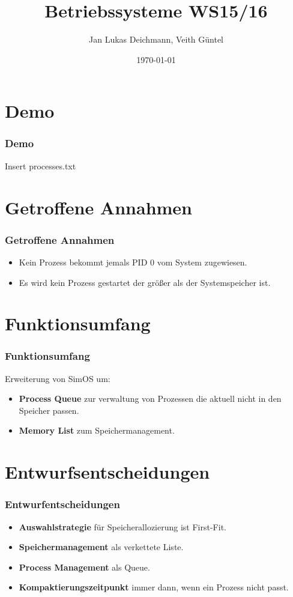 \documentclass{beamer}
\author{Jan Lukas Deichmann, Veith Güntel}
\title{Betriebssysteme WS15/16}
\date{\today}
\begin{document}
\maketitle
\frame{\tableofcontents}

\section{Demo}
\begin{frame}
\frametitle{Demo}
Insert processes.txt
\end{frame}

\section{Getroffene Annahmen}
\begin{frame}
\frametitle{Getroffene Annahmen}
\begin{itemize}
	\item Kein Prozess bekommt jemals PID 0 vom System zugewiesen.
	\item Es wird kein Prozess gestartet der größer als der Systemspeicher ist.
\end{itemize}
\end{frame}

\section{Funktionsumfang}
\begin{frame}
\frametitle{Funktionsumfang}
Erweiterung von SimOS um:
\begin{itemize}
	\item \textbf{Process Queue} zur verwaltung von Prozessen die aktuell nicht in den Speicher passen.
	\item \textbf{Memory List} zum Speichermanagement.
\end{itemize}
\end{frame}

\section{Entwurfsentscheidungen}
\begin{frame}
\frametitle{Entwurfentscheidungen}
\begin{itemize}
	\item \textbf{Auswahlstrategie} für Speicherallozierung ist First-Fit.
	\item \textbf{Speichermanagement} als verkettete Liste.
	\item \textbf{Process Management} als Queue.
	\item \textbf{Kompaktierungszeitpunkt} immer dann, wenn ein Prozess nicht passt.
\end{itemize}
\end{frame}
\end{document}

